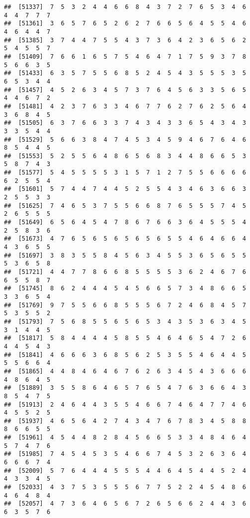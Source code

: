 \documentclass[
]{book}
\begin{document}
\begin{verbatim}
##  [51337]  7  5  3  2  4  4  6  6  8  4  3  7  2  7  6  5  3  4  6  4  4  7  7  7
##  [51361]  3  6  5  7  6  5  2  6  2  7  6  6  5  6  4  5  5  4  6  4  6  4  4  7
##  [51385]  3  7  4  4  7  5  5  4  3  7  3  6  4  2  3  6  5  6  2  5  4  5  5  7
##  [51409]  7  6  6  1  6  5  7  5  4  6  4  7  1  7  5  9  3  7  8  5  6  6  3  5
##  [51433]  6  3  5  7  5  5  6  8  5  2  4  5  4  3  5  5  5  3  5  6  5  3  4  4
##  [51457]  4  5  2  6  3  4  5  7  3  7  6  4  5  6  3  3  5  6  5  4  4  6  7  2
##  [51481]  4  2  3  7  6  3  3  4  6  7  7  6  2  7  6  2  5  6  4  3  6  8  4  5
##  [51505]  6  3  7  6  6  3  3  7  4  3  4  3  3  6  5  4  3  4  3  3  3  5  4  4
##  [51529]  5  6  6  3  8  4  7  4  5  3  4  5  9  4  6  7  6  4  6  8  5  4  4  5
##  [51553]  5  2  5  5  6  4  8  6  5  6  8  3  4  4  8  6  6  5  3  5  8  7  4  3
##  [51577]  5  4  5  5  5  5  3  1  5  7  1  2  7  5  5  6  6  6  6  6  2  5  5  4
##  [51601]  5  7  4  4  7  4  4  5  2  5  5  4  3  4  6  3  6  6  3  2  5  5  3  3
##  [51625]  7  4  6  5  3  7  5  5  6  6  8  7  6  5  5  5  7  4  5  2  6  5  5  5
##  [51649]  6  5  6  4  5  4  7  8  6  7  6  6  3  6  4  5  5  5  4  2  5  8  3  6
##  [51673]  4  7  6  5  6  5  6  5  6  5  6  5  5  4  6  4  6  6  4  4  3  6  5  5
##  [51697]  3  8  3  5  5  8  4  5  6  3  4  5  5  3  6  5  6  5  5  5  3  6  5  8
##  [51721]  4  4  7  7  8  6  6  8  5  5  5  5  3  6  2  4  6  7  6  6  5  5  8  7
##  [51745]  8  6  2  4  4  4  5  4  5  6  6  5  7  3  4  8  6  6  5  3  3  6  5  4
##  [51769]  9  7  5  5  6  6  8  5  5  5  6  7  2  4  6  8  4  5  7  5  3  5  5  2
##  [51793]  7  5  6  8  5  5  6  5  6  5  3  4  3  5  3  6  3  4  5  3  1  4  4  5
##  [51817]  5  8  4  4  4  4  5  8  5  5  4  6  4  6  5  4  7  2  6  4  4  5  4  3
##  [51841]  4  6  6  6  3  6  8  5  6  2  5  3  5  5  4  6  4  4  5  5  5  6  6  4
##  [51865]  4  4  8  4  6  4  6  7  6  2  6  3  4  5  4  3  6  6  6  4  8  6  4  5
##  [51889]  3  5  5  8  6  4  6  5  7  6  5  4  7  6  3  6  6  4  3  8  5  4  7  5
##  [51913]  2  4  6  4  4  3  5  5  4  6  6  7  4  6  4  7  7  4  6  4  5  5  2  5
##  [51937]  4  6  5  6  4  2  7  4  3  4  7  6  7  8  3  4  5  8  8  8  6  6  5  5
##  [51961]  4  5  4  4  8  2  8  4  5  6  6  5  3  3  4  8  4  6  4  5  7  4  7  6
##  [51985]  7  4  5  4  5  3  5  4  6  6  7  4  5  3  2  6  3  6  4  6  6  6  7  4
##  [52009]  5  7  6  4  4  4  5  5  5  4  4  6  4  5  4  4  5  2  4  4  3  3  4  5
##  [52033]  4  3  7  5  3  5  5  5  6  7  7  5  2  2  4  5  4  8  6  4  6  4  8  4
##  [52057]  4  7  3  6  4  6  5  6  7  2  6  5  6  6  2  4  4  3  6  6  3  5  7  6

\end{verbatim}
\end{document}
